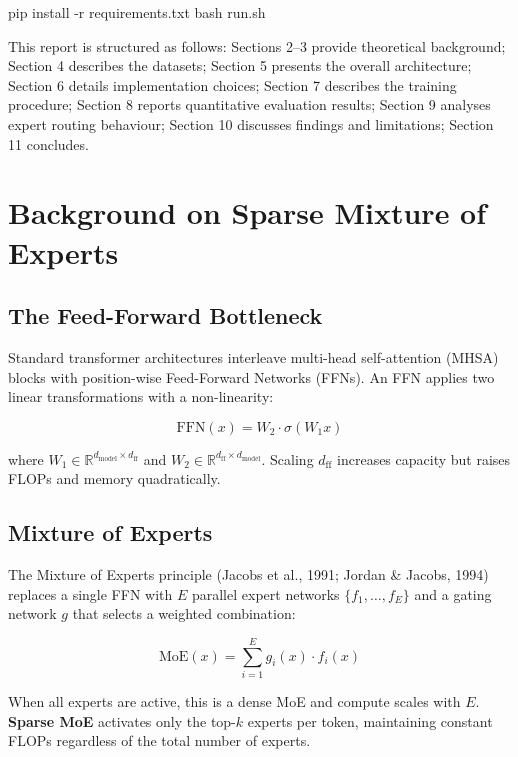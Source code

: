 \documentclass[11pt]{article}
\begin{document}
\begin{CodeBlock}
pip install -r requirements.txt
bash run.sh
\end{CodeBlock}


This report is structured as follows: Sections 2–3 provide theoretical background; Section 4 describes the datasets; Section 5 presents the overall architecture; Section 6 details implementation choices; Section 7 describes the training procedure; Section 8 reports quantitative evaluation results; Section 9 analyses expert routing behaviour; Section 10 discusses findings and limitations; Section 11 concludes.



\section{Background on Sparse Mixture of Experts}


\subsection{The Feed-Forward Bottleneck}


Standard transformer architectures interleave multi-head self-attention (MHSA) blocks with position-wise Feed-Forward Networks (FFNs). An FFN applies two linear transformations with a non-linearity:


$$\text{FFN}(x) = W_2 \cdot \sigma(W_1 x)$$


where $W_1 \in \mathbb{R}^{d_{\text{model}} \times d_{\text{ff}}}$ and $W_2 \in \mathbb{R}^{d_{\text{ff}} \times d_{\text{model}}}$. Scaling $d_{\text{ff}}$ increases capacity but raises FLOPs and memory quadratically.


\subsection{Mixture of Experts}


The Mixture of Experts principle (Jacobs et al., 1991; Jordan \& Jacobs, 1994) replaces a single FFN with $E$ parallel expert networks $\{f_1, \ldots, f_E\}$ and a gating network $g$ that selects a weighted combination:


$$\text{MoE}(x) = \sum_{i=1}^{E} g_i(x) \cdot f_i(x)$$


When all experts are active, this is a dense MoE and compute scales with $E$. \textbf{Sparse MoE} activates only the top-$k$ experts per token, maintaining constant FLOPs regardless of the total number of experts.
\end{document}
